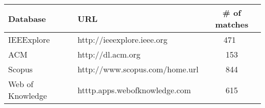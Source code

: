 \begin{center}
\label{databasetable}
\begin{tabular}{l l c }
    \bfseries{Database} & \bfseries{URL} & \bfseries{\# of matches} \\
    \hline
    IEEExplore & http://ieeexplore.ieee.org & 471 \\
    ACM & http://dl.acm.org & 153 \\
    Scopus & http://www.scopus.com/home.url & 844 \\
    Web of Knowledge & htttp.apps.webofknowledge.com &  615 \\
    \hline
\end{tabular}
\end{center}
